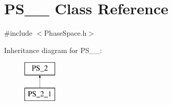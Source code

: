 \hypertarget{classPS__2__1}{\section{P\-S\-\_\-\_ Class Reference}
\label{classPS__2__1}
}


{\ttfamily \#include $<$Phase\-Space.\-h$>$}

Inheritance diagram for P\-S\-\_\-\_\-:\begin{figure}[H]
\begin{center}
\leavevmode
\includegraphics[height=2.000000cm]{classPS__2__1}
\end{center}
\end{figure}
